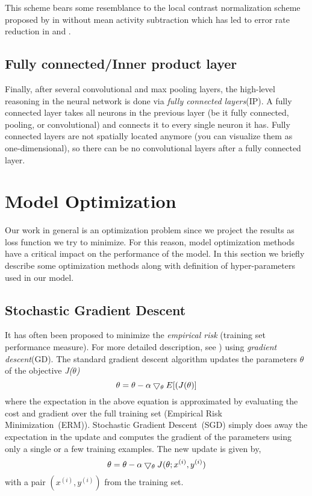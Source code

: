 \indent This scheme bears some resemblance to the local contrast normalization scheme proposed by \citeauthor{jarrett2009best} in \cite{jarrett2009best} without mean activity subtraction  which has led to error rate reduction in \cite{krizhevsky2012imagenet} and \cite{hinton2012improving}. 

\subsection{Fully connected/Inner product layer}

Finally, after several convolutional and max pooling layers, the high-level reasoning in the neural network is done via \textit{fully connected layers}(IP). A fully connected layer takes all neurons in the previous layer (be it fully connected, pooling, or convolutional) and connects it to every single neuron it has. Fully connected layers are not spatially located anymore (you can visualize them as one-dimensional), so there can be no convolutional layers after a fully connected layer. 

\section{Model Optimization}
Our work in general is an optimization problem since we project the results as loss function we try to minimize. For this reason, model optimization methods have a critical impact on the performance of the model. In this section we briefly describe some optimization methods along with definition of hyper-parameters used in our model.  
\subsection{Stochastic Gradient Descent}
\label{subsec:sgd}
It has often been proposed to minimize the \textit{empirical risk} (training set performance measure). For more detailed description, see \cite{vapnik1998statistical}) using \textit{gradient descent}(GD)\cite{bottou2010large}. The standard gradient descent algorithm updates the parameters $\theta$ of the objective \textit{J($\theta$)}  
\begin{equation}
\centering \theta = \theta - \alpha \bigtriangledown_\theta E[(J(\theta)]
\end{equation}
where the expectation in the above equation is approximated by evaluating the cost and gradient over the full training set (Empirical Risk Minimization~(ERM)). Stochastic Gradient Descent~(SGD) simply does away the expectation in the update and computes the gradient of the parameters using only a single or a few training examples. The new update is given by,   
\begin{equation}
\centering \theta = \theta - \alpha \bigtriangledown_\theta J(\theta; x^{(i)}, y^{(i)})
\end{equation}
with a pair $(x^{(i)}, y^{(i)})$ from the training set\cite{sgd}. 

